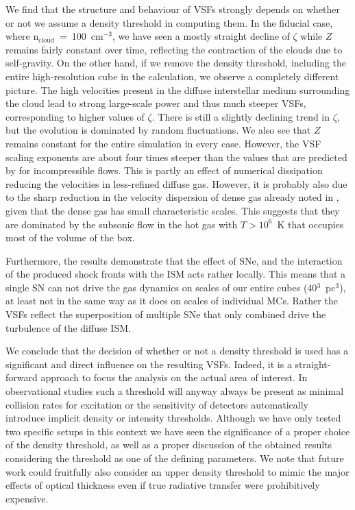 We find that the structure and behaviour of VSFs strongly depends on whether or not we assume a density threshold in computing them.
In the fiducial case, where n$_\mathrm{cloud}$~=~100~cm$^{-3}$, we have seen a mostly straight decline of $\zeta$ while $Z$ remains fairly constant over time, reflecting the contraction of the clouds due to self-gravity.
On the other hand, if we remove the density threshold, including the entire high-resolution cube in the calculation, we observe a completely different picture.
The high velocities present in the diffuse interstellar medium surrounding the cloud lead to strong large-scale power and thus much steeper VSFs, corresponding to higher values of $\zeta$. 
There is still a slightly declining trend in $\zeta$, but the evolution is dominated by random fluctuations.
We also see that $Z$ remains constant for the entire simulation in every case.
However, the VSF scaling exponents are about four times steeper than the values that are predicted by \citep{Boldyrev2002} for incompressible flows.
This is partly an effect of numerical dissipation reducing the velocities in less-refined diffuse gas.
However, it is probably also due to the sharp reduction in the velocity dispersion of dense gas already noted in , given that the dense gas has small characteristic scales.
This suggests that they are dominated by the subsonic flow in the hot gas with $T > 10^6$~K that occupies most of the volume of the box.

Furthermore, the results demonstrate that the effect of SNe, and the interaction of the produced shock fronts with the ISM acts rather locally. 
This means that a single SN can not drive the gas dynamics on scales of our entire cubes (40$^3$~pc$^3$), at least not in the same way as it does on scales of individual MCs.
Rather the VSFs reflect the superposition of multiple SNe that only combined drive the turbulence of the diffuse ISM.

We conclude that the decision of whether or not a density threshold is used has a significant and direct influence on the resulting VSFs.
Indeed, it is a straight-forward approach to focus the analysis on the actual area of interest.
In observational studies such a threshold will anyway always be present as minimal collision rates for excitation or the sensitivity of detectors automatically introduce implicit density or intensity thresholds. 
Although we have only tested two specific setups in this context we have seen the significance of a proper choice of the density threshold, as well as a proper discussion of the obtained results considering the threshold as one of the defining parameters.
We note that future work could fruitfully also consider an upper density threshold to mimic the major effects of optical thickness even if true radiative transfer were prohibitively expensive.

